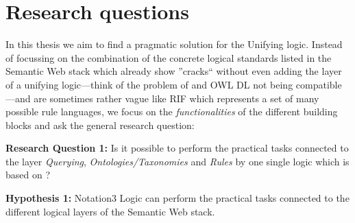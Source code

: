 % 
% 
% 




\section{Research questions}

In this thesis we aim to find a pragmatic solution for the Unifying logic. Instead of focussing on the combination of the concrete logical standards listed in the 
Semantic Web stack which already show ''cracks`` without even adding the layer of a unifying logic---think of the problem of \rdf and OWL DL not being compatible---and 
are sometimes rather vague like RIF which represents a set of many possible rule languages, we focus on the \emph{functionalities} of the different building blocks and 
ask the general research question:

\textbf{Research Question 1:} Is it possible to perform the practical tasks 
connected to the layer \emph{Querying}, \emph{Ontologies/Taxonomies} and \emph{Rules}
by one single logic which is based on \rdf?

\textbf{Hypothesis 1:} Notation3 Logic can perform the practical tasks connected to the different logical layers of the Semantic Web stack.




